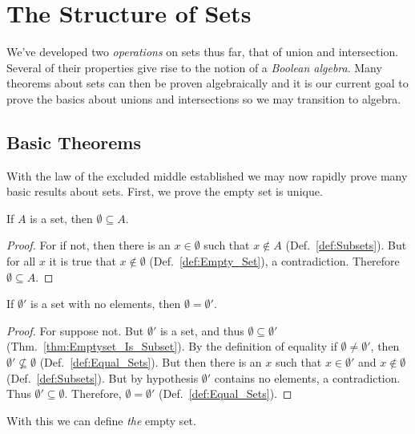 \section{The Structure of Sets}
    We've developed two \textit{operations} on sets thus
    far, that of union and intersection. Several of their properties give rise
    to the notion of a \textit{Boolean algebra}. Many
    theorems about sets can then be proven algebraically and it is our current
    goal to prove the basics about unions and intersections so we may transition
    to algebra.
    \subsection{Basic Theorems}
        With the law of the excluded middle established we may now rapidly prove
        many basic results about sets. First, we prove the empty set is unique.
        \begin{theorem}
            \label{thm:Emptyset_Is_Subset}%
            If $A$ is a set, then $\emptyset\subseteq{A}$.
        \end{theorem}
        \begin{proof}
            For if not, then there is an $x\in\emptyset$ such that
            $x\notin{A}$ (Def.~\ref{def:Subsets}). But for all $x$ it is true
            that $x\notin\emptyset$ (Def.~\ref{def:Empty_Set}), a contradiction.
            Therefore $\emptyset\subseteq{A}$.
        \end{proof}
        \begin{theorem}
            \label{thm:Empty_Set_is_Unique}%
            If $\emptyset'$ is a set with no elements, then
            $\emptyset=\emptyset'$.
        \end{theorem}
        \begin{proof}
            For suppose not. But $\emptyset'$ is a set, and thus
            $\emptyset\subseteq\emptyset'$ (Thm.~\ref{thm:Emptyset_Is_Subset}).
            By the definition of equality if $\emptyset\ne\emptyset'$,
            then $\emptyset'\nsubseteq\emptyset$ (Def.~\ref{def:Equal_Sets}).
            But then there is an $x$ such that $x\in\emptyset'$ and
            $x\notin\emptyset$ (Def.~\ref{def:Subsets}). But by hypothesis
            $\emptyset'$ contains no elements, a contradiction. Thus
            $\emptyset'\subseteq\emptyset$. Therefore, $\emptyset=\emptyset'$
            (Def.~\ref{def:Equal_Sets}).
        \end{proof}
        With this we can define \textit{the} empty set.
